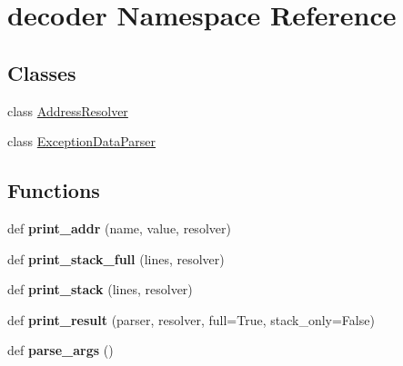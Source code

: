 \hypertarget{namespacedecoder}{}\section{decoder Namespace Reference}
\label{namespacedecoder}
\subsection*{Classes}
\begin{DoxyCompactItemize}
\item 
class \mbox{\hyperlink{classdecoder_1_1_address_resolver}{Address\+Resolver}}
\item 
class \mbox{\hyperlink{classdecoder_1_1_exception_data_parser}{Exception\+Data\+Parser}}
\end{DoxyCompactItemize}
\subsection*{Functions}
\begin{DoxyCompactItemize}
\item 
\mbox{\label{namespacedecoder_a89d16221d7f9e232743edc5fe336fc65}} 
def {\bfseries print\+\_\+addr} (name, value, resolver)
\item 
\mbox{\label{namespacedecoder_a327191303799877f3acc7f2468b5427c}} 
def {\bfseries print\+\_\+stack\+\_\+full} (lines, resolver)
\item 
\mbox{\label{namespacedecoder_a0da171fca090b030a6442be72460a695}} 
def {\bfseries print\+\_\+stack} (lines, resolver)
\item 
\mbox{\label{namespacedecoder_a1c630b1370c511ddf5c920dcfccd2789}} 
def {\bfseries print\+\_\+result} (parser, resolver, full=True, stack\+\_\+only=False)
\item 
\mbox{\label{namespacedecoder_a6791b7e0bad342ffcf9cb0e11b828cf0}} 
def {\bfseries parse\+\_\+args} ()
\end{DoxyCompactItemize}
